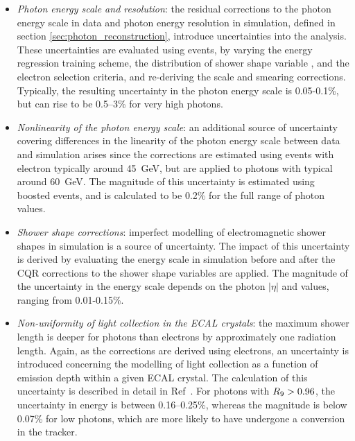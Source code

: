 \begin{itemize}
    \item \textit{Photon energy scale and resolution}: the residual corrections to the photon energy scale in data and photon energy resolution in simulation, defined in section \ref{sec:photon_reconstruction}, introduce uncertainties into the analysis. These uncertainties are evaluated using \Zee events, by varying the energy regression training scheme, the distribution of shower shape variable \RNINE, and the electron selection criteria, and re-deriving the scale and smearing corrections. Typically, the resulting uncertainty in the photon energy scale is 0.05-0.1\%, but can rise to be 0.5--3\% for very high \pt photons.
    
    \item \textit{Nonlinearity of the photon energy scale}: an additional source of uncertainty covering differences in the linearity of the photon energy scale between data and simulation arises since the corrections are estimated using \Zee events with electron \pt typically around 45~GeV, but are applied to photons with typical \pt around 60~GeV. The magnitude of this uncertainty is estimated using boosted \Zee events, and is calculated to be 0.2\% for the full range of photon \pt values.
    
    \item \textit{Shower shape corrections}: imperfect modelling of electromagnetic shower shapes in simulation is a source of uncertainty. The impact of this uncertainty is derived by evaluating the energy scale in simulation before and after the CQR corrections to the shower shape variables are applied. The magnitude of the uncertainty in the energy scale depends on the photon $|\eta|$ and \RNINE values, ranging from 0.01-0.15\%.
    
    \item \textit{Non-uniformity of light collection in the ECAL crystals}: the maximum shower length is deeper for photons than electrons by approximately one radiation length. Again, as the corrections are derived using electrons, an uncertainty is introduced concerning the modelling of light collection as a function of emission depth within a given ECAL crystal. The calculation of this uncertainty is described in detail in Ref~\cite{Sirunyan:2020xwk}. For photons with $R_9 > 0.96$, the uncertainty in energy is between 0.16--0.25\%, whereas the magnitude is below 0.07\% for low \RNINE photons, which are more likely to have undergone a conversion in the tracker.
    

\end{itemize}
